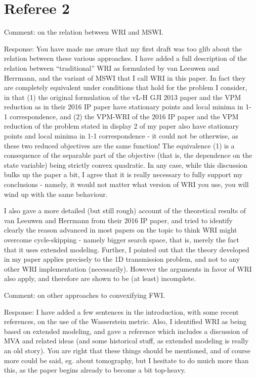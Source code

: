 \section{Referee 2}

\noindent Comment: on the relation between WRI and MSWI.

\noindent Response: You have made me aware that my first draft was too glib about the relation between these various approaches. I have added a full description of the relation between ``traditional'' WRI as formulated by van Leeuwen and Herrmann, and the variant of MSWI that I call WRI in this paper. In fact they are completely equivalent under conditions that hold for the problem I consider, in that (1) the original formulation of the vL-H GJI 2013 paper and the VPM reduction as in their 2016 IP paper have stationary points and local minima in 1-1 correspondence, and (2) the VPM-WRI of the 2016 IP paper and the VPM reduction of the problem stated in display 2 of my paper also have stationary points and local minima in 1-1 correspondence - it could not be otherwise, as these two reduced objectives are the same function! The equivalence (1) is a consequence of the separable part of the objective (that is, the dependence on the state variable) being strictly convex quadratic. In any case, while this discussion bulks up the paper a bit, I agree that it is really necessary to fully support my conclusions - namely, it would not matter what version of WRI you use, you will wind up with the same behaviour.

I also gave a more detailed (but still rough) account of the theoretical results of van Leeuwen and Herrmann from their 2016 IP paper, and tried to identify clearly the reason advanced in most papers on the topic to think WRI might overcome cycle-skipping - namely bigger search space, that is, merely the fact that it uses extended modeling. Further, I pointed out that the theory developed in my paper applies precisely to the 1D transmission problem, and not to any other WRI implementation (necessarily). However the arguments in favor of WRI also apply, and therefore are shown to be (at least) incomplete.

\noindent Comment: on other approaches to convexifying FWI.

\noindent Response: I have added a few sentences in the introduction, with some recent references, on the use of the Wasserstein metric. Also, I identified WRI as being based on extended modeling, and gave a reference which includes a discussion of MVA and related ideas (and some historical stuff, as extended modeling is really an old story). You are right that these things should be mentioned, and of course more could be said, eg. about tomography, but I hesitate to do muich more than this, as the paper begins already to become a bit top-heavy.

